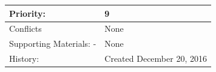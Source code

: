 \documentclass{scrreprt}
\begin{document}
\begin{table}[h!]
\begin{tabular}{|l|l|}
Priority:               & 9                                                                                                                                                                                                      \\ \hline
Conflicts               & None                                                                                                                                                                                                   \\ \hline
Supporting Materials: - & None                                                                                                                                                                                                   \\ \hline
History:                & Created December 20, 2016                                                                                                                                                                              \\ \hline
\end{tabular}
\end{table}
\end{document}

